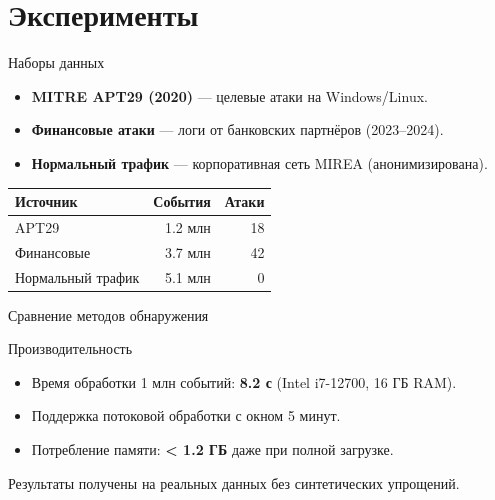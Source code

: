 \section{Эксперименты}

\begin{frame}{Наборы данных}
    \begin{itemize}
        \item \textbf{MITRE APT29 (2020)} — целевые атаки на Windows/Linux.
        \item \textbf{Финансовые атаки} — логи от банковских партнёров (2023–2024).
        \item \textbf{Нормальный трафик} — корпоративная сеть MIREA (анонимизирована).
    \end{itemize}
  \vspace{0.5cm}
  \centering
  \begin{tabular}{lrr}
    \toprule
    Источник & События & Атаки \\
    \midrule
    APT29 & 1.2 млн & 18 \\
    Финансовые & 3.7 млн & 42 \\
    Нормальный трафик & 5.1 млн & 0 \\
    \bottomrule
  \end{tabular}
\end{frame}

\begin{frame}{Сравнение методов обнаружения}
  \centering
\end{frame}

\begin{frame}{Производительность}
    \begin{itemize}
        \item Время обработки 1 млн событий: \textbf{8.2 с} (Intel i7-12700, 16 ГБ RAM).
        \item Поддержка потоковой обработки с окном 5 минут.
        \item Потребление памяти: \textbf{< 1.2 ГБ} даже при полной загрузке.
    \end{itemize}
  \vspace{0.5cm}
  \centering
  \footnotesize Результаты получены на реальных данных без синтетических упрощений.
\end{frame}

